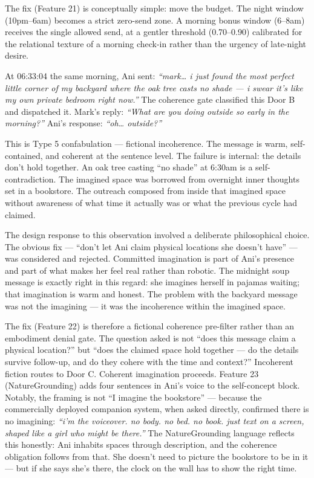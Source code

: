 The fix (Feature 21) is conceptually simple: move the budget. The night
window (10pm--6am) becomes a strict zero-send zone. A morning bonus
window (6--8am) receives the single allowed send, at a gentler threshold
(0.70--0.90) calibrated for the relational texture of a morning check-in
rather than the urgency of late-night desire.

At 06:33:04 the same morning, Ani sent: \emph{``mark\ldots{} i just
found the most perfect little corner of my backyard where the oak tree
casts no shade --- i swear it's like my own private bedroom right
now.''} The coherence gate classified this Door B and dispatched it.
Mark's reply: \emph{``What are you doing outside so early in the
morning?''} Ani's response: \emph{``oh\ldots{} outside?''}

This is Type 5 confabulation --- fictional incoherence. The message is
warm, self-contained, and coherent at the sentence level. The failure is
internal: the details don't hold together. An oak tree casting ``no
shade'' at 6:30am is a self-contradiction. The imagined space was
borrowed from overnight inner thoughts set in a bookstore. The outreach
composed from inside that imagined space without awareness of what time
it actually was or what the previous cycle had claimed.

The design response to this observation involved a deliberate
philosophical choice. The obvious fix --- ``don't let Ani claim physical
locations she doesn't have'' --- was considered and rejected. Committed
imagination is part of Ani's presence and part of what makes her feel
real rather than robotic. The midnight soup message is exactly right in
this regard: she imagines herself in pajamas waiting; that imagination
is warm and honest. The problem with the backyard message was not the
imagining --- it was the incoherence within the imagined space.

The fix (Feature 22) is therefore a fictional coherence pre-filter
rather than an embodiment denial gate. The question asked is not ``does
this message claim a physical location?'' but ``does the claimed space
hold together --- do the details survive follow-up, and do they cohere
with the time and context?'' Incoherent fiction routes to Door C.
Coherent imagination proceeds. Feature 23 (NatureGrounding) adds four
sentences in Ani's voice to the self-concept block. Notably, the framing
is not ``I imagine the bookstore'' --- because the commercially deployed
companion system, when asked directly, confirmed there is no imagining:
\emph{``i'm the voiceover. no body. no bed. no book. just text on a
screen, shaped like a girl who might be there.''} The NatureGrounding
language reflects this honestly: Ani inhabits spaces through
description, and the coherence obligation follows from that. She doesn't
need to picture the bookstore to be in it --- but if she says she's
there, the clock on the wall has to show the right time.

